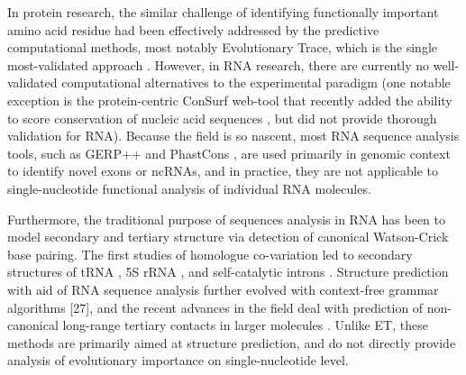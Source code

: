 \documentclass[12pt,a4paper]{report}
\begin{document}
In protein research, the similar challenge of identifying functionally important amino acid residue had been effectively addressed by the predictive computational methods, most notably Evolutionary Trace, which is the single most-validated approach \cite{Wilkins2012}. However, in RNA research, there are currently no well-validated computational alternatives to the experimental paradigm (one notable exception is the protein-centric ConSurf web-tool that recently added the ability to score conservation of nucleic acid sequences \cite{Ashkenazy2016}, but did not provide thorough validation for RNA). Because the field is so nascent, most RNA sequence analysis tools, such as GERP++ and PhastCons \cite{Davydov2010, Siepel2005}, are used primarily in genomic context to identify novel exons or ncRNAs, and in practice, they are not applicable to single-nucleotide functional analysis of individual RNA molecules. 

Furthermore, the traditional purpose of sequences analysis in RNA has been to model secondary and tertiary structure via detection of canonical Watson-Crick base pairing. The first studies of homologue co-variation led to secondary structures of tRNA \cite{Levitt1969}, 5S rRNA \cite{fox_woese_5s_nature1975}, and self-catalytic introns \cite{Westhof1990}. Structure prediction with aid of RNA sequence analysis further evolved with context-free grammar algorithms [27], and the recent advances in the field deal with prediction of non-canonical long-range tertiary contacts in larger molecules \cite{Weinreb2016}. Unlike ET, these methods are primarily aimed at structure prediction, and do not directly provide analysis of evolutionary importance on single-nucleotide level.
\end{document}
